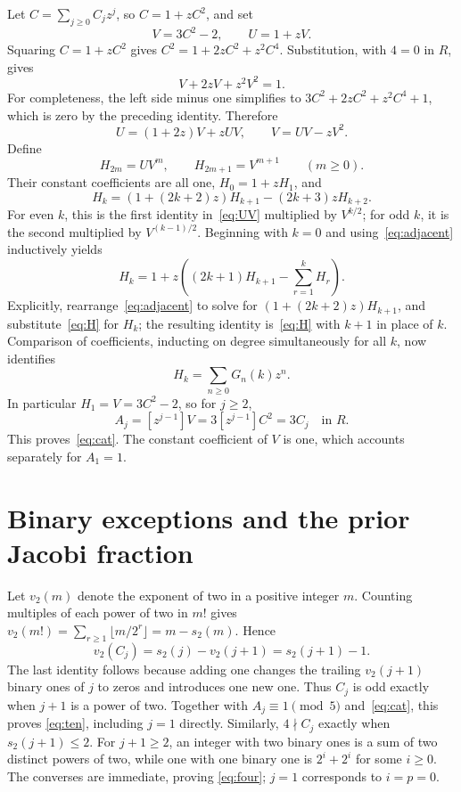 \documentclass[11pt]{article}
\newcommand{\coef}[2]{[z^{#1}]#2}
\begin{document}
Let $C=\sum_{j\geq0}C_jz^j$, so $C=1+zC^2$, and set
\[
 V=3C^2-2,\qquad U=1+zV.
\]
Squaring $C=1+zC^2$ gives $C^2=1+2zC^2+z^2C^4$.
Substitution, with $4=0$ in $R$, gives
\begin{equation}\label{eq:V}
 V+2zV+z^2V^2=1.
\end{equation}
For completeness, the left side minus one simplifies to
$3C^2+2zC^2+z^2C^4+1$, which is zero by the preceding identity.
Therefore
\begin{equation}\label{eq:UV}
 U=(1+2z)V+zUV,\qquad V=UV-zV^2.
\end{equation}
Define
\[
 H_{2m}=UV^m,\qquad H_{2m+1}=V^{m+1}\qquad(m\geq0).
\]
Their constant coefficients are all one, $H_0=1+zH_1$, and
\begin{equation}\label{eq:adjacent}
 H_k=(1+(2k+2)z)H_{k+1}-(2k+3)zH_{k+2}.
\end{equation}
For even $k$, this is the first identity in~\eqref{eq:UV} multiplied
by $V^{k/2}$; for odd $k$, it is the second multiplied by
$V^{(k-1)/2}$. Beginning with $k=0$ and using~\eqref{eq:adjacent}
inductively yields
\begin{equation}\label{eq:H}
 H_k=1+z\left((2k+1)H_{k+1}-\sum_{r=1}^kH_r\right).
\end{equation}
Explicitly, rearrange~\eqref{eq:adjacent} to solve for
$(1+(2k+2)z)H_{k+1}$, and substitute~\eqref{eq:H} for $H_k$;
the resulting identity is~\eqref{eq:H} with $k+1$ in place of $k$.
Comparison of coefficients, inducting on degree simultaneously for
all $k$, now identifies
\[
 H_k=\sum_{n\geq0}G_n(k)z^n.
\]
In particular $H_1=V=3C^2-2$, so for $j\geq2$,
\[
 A_j=\coef{j-1}{V}=3\coef{j-1}{C^2}=3C_j\quad\text{in }R.
\]
This proves~\eqref{eq:cat}. The constant coefficient of $V$ is one,
which accounts separately for $A_1=1$.

\section{Binary exceptions and the prior Jacobi fraction}
Let $v_2(m)$ denote the exponent of two in a positive integer $m$.
Counting multiples of each power of two in $m!$ gives
$v_2(m!)=\sum_{r\geq1}\lfloor m/2^r\rfloor=m-s_2(m)$.
Hence
\[
 v_2(C_j)=s_2(j)-v_2(j+1)=s_2(j+1)-1.
\]
The last identity follows because adding one changes the trailing
$v_2(j+1)$ binary ones of $j$ to zeros and introduces one new one.
Thus $C_j$ is odd exactly when $j+1$ is a power of two.
Together with $A_j\equiv1\pmod5$ and~\eqref{eq:cat}, this proves
\eqref{eq:ten}, including $j=1$ directly.
Similarly, $4\nmid C_j$ exactly when $s_2(j+1)\leq2$.
For $j+1\geq2$, an integer with two binary ones is a sum of two
distinct powers of two, while one with one binary one is
$2^i+2^i$ for some $i\geq0$. The converses are immediate, proving
\eqref{eq:four}; $j=1$ corresponds to $i=p=0$.
\end{document}
